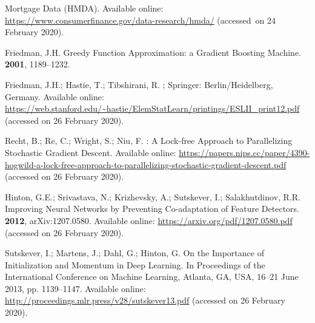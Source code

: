 \documentclass[information,article,accept,moreauthors,pdftex]{Definitions/mdpi}
\begin{document}
{\begin{thebibliography}{999}
Mortgage Data ({H}{M}{D}{A}).
\newblock Available online:  \url{https://www.consumerfinance.gov/data-research/hmda/} ({accessed~on 24 February 2020}).

Friedman, J.H.
\newblock Greedy {F}unction {A}pproximation: a {G}radient {B}oosting {M}achine.
 {\bf 2001}, 1189--1232.

Friedman, J.H.; Hastie, T.; Tibshirani, R.
; Springer: Berlin/Heidelberg, Germany.
\newblock Available online: 
  \url{https://web.stanford.edu/~hastie/ElemStatLearn/printings/ESLII\_print12.pdf} (accessed on 26 February 2020).

Recht, B.; Re, C.; Wright, S.; Niu, F.
: {A} {L}ock-free {A}pproach to {P}arallelizing
  {S}tochastic {G}radient {D}escent.
\newblock Available online: 
  \url{https://papers.nips.cc/paper/4390-hogwild-a-lock-free-approach-to-parallelizing-stochastic-gradient-descent.pdf}  (accessed on 26 February 2020).

Hinton, G.E.; Srivastava, N.; Krizhevsky, A.; Sutskever, I.; Salakhutdinov,
  R.R.
\newblock Improving {N}eural {N}etworks by {P}reventing {C}o-adaptation of
  {F}eature {D}etectors.
 {\bf 2012}, arXiv:1207.0580.
\newblock Available online: \url{https://arxiv.org/pdf/1207.0580.pdf}  (accessed on 26 February 2020).

Sutskever, I.; Martens, J.; Dahl, G.; Hinton, G.
\newblock On the {I}mportance of {I}nitialization and {M}omentum in {D}eep
  {L}earning.
\newblock  In Proceedings of the International Conference on Machine Learning, Atlanta, GA, USA, 16--21 June 2013, pp. 1139--1147. 
\newblock Available online: \url{http://proceedings.mlr.press/v28/sutskever13.pdf} (accessed on 26 February 2020).


\end{thebibliography}}
\end{document}
